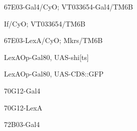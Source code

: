 \documentclass[17pt]{extarticle}
\begin{document}
\vspace*{\fill}\begin{scriptsize}
67E03-Gal4/CyO; VT033654-Gal4/TM6B \\[0.5em]
\end{scriptsize}
\footnotesize
\vspace*{\fill}
\newpage{}
\vspace*{\fill}\begin{footnotesize}
If/CyO; VT033654/TM6B \\[0.5em]
\end{footnotesize}
\footnotesize
\vspace*{\fill}
\newpage{}
\vspace*{\fill}\begin{footnotesize}
67E03-LexA/CyO; Mkrs/TM6B \\[0.5em]
\end{footnotesize}
\footnotesize
\vspace*{\fill}
\newpage{}
\vspace*{\fill}\begin{footnotesize}
LexAOp-Gal80, UAS-shi[ts] \\[0.5em]
\end{footnotesize}
\footnotesize
\vspace*{\fill}
\newpage{}
\vspace*{\fill}\begin{footnotesize}
LexAOp-Gal80, UAS-CD8::GFP \\[0.5em]
\end{footnotesize}
\footnotesize
\vspace*{\fill}
\newpage{}
\vspace*{\fill}\begin{large}
70G12-Gal4 \\[0.5em]
\end{large}
\footnotesize
\vspace*{\fill}
\newpage{}
\vspace*{\fill}\begin{large}
70G12-LexA \\[0.5em]
\end{large}
\footnotesize
\vspace*{\fill}
\newpage{}
\vspace*{\fill}\begin{large}
72B03-Gal4 \\[0.5em]
\end{large}
\footnotesize
\vspace*{\fill}
\end{document}
